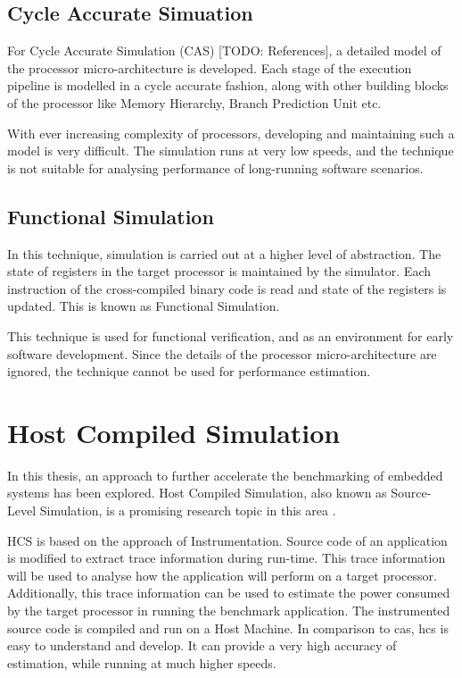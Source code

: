 \subsection{Cycle Accurate Simuation}
For Cycle Accurate Simulation (CAS) [TODO: References], a detailed model of the processor micro-architecture is developed. Each stage of the execution pipeline is modelled in a cycle accurate fashion, along with other building blocks of the processor like Memory Hierarchy, Branch Prediction Unit etc.

With ever increasing complexity of processors, developing and maintaining such a model is very difficult. The simulation runs at very low speeds, and the technique is not suitable for analysing performance of long-running software scenarios.

\subsection{Functional Simulation}
In this technique, simulation is carried out at a higher level of abstraction. The state of registers in the target processor is maintained by the simulator. Each instruction of the cross-compiled binary code is read and state of the registers is updated. This is known as Functional Simulation.

This technique is used for functional verification, and as an environment for early software development. Since the details of the processor micro-architecture are ignored, the technique cannot be used for performance estimation.

\section{Host Compiled Simulation}
In this thesis, an approach to further accelerate the benchmarking of embedded systems has been explored. Host Compiled Simulation, also known as Source-Level Simulation, is a promising research topic in this area \cite{RBA2013, Lu2013, Mueller2011}. 

HCS is based on the approach of Instrumentation. Source code of an application is modified to extract trace information during run-time. This trace information will be used to analyse how the application will perform on a target processor. Additionally, this trace information can be used to estimate the power consumed by the target processor in running the benchmark application. The instrumented source code is compiled and run on a Host Machine. In comparison to \gls{cas}, \gls{hcs} is easy to understand and develop. It can provide a very high accuracy of estimation, while running at much higher speeds.

